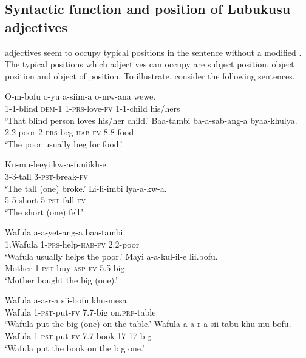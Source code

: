 \documentclass[output=paper,
modfonts
]{langscibook}
\begin{document}
\subsection{Syntactic function and position of Lubukusu adjectives  }

 adjectives seem to occupy typical  positions in the sentence without a modified . The typical  positions which  adjectives can occupy are subject position, object position and object of  position. To illustrate, consider the following sentences.

\ea\label{ex:wasike:17}
\ea
\gll O-m-bofu o-yu a-siim-a o-mw-ana wewe.\\
     1-1-blind \textsc{dem}-1 1-\textsc{prs}-love-\textsc{fv} 1-1-child his/hers\\
\glt ‘That blind person loves his/her child.’
\ex
\gll  Baa-tambi ba-a-sab-ang-a byaa-khulya.\\
     2.2-poor 2-\textsc{prs}-beg-\textsc{hab}-\textsc{fv} 8.8-food\\
\glt ‘The poor usually beg for food.’
\z
\z

\ea\label{ex:wasike:18}
\ea
\gll Ku-mu-leeyi kw-a-funiikh-e.\\
     3-3-tall 3-\textsc{pst}-break-\textsc{fv}\\
\glt ‘The tall (one) broke.’
\ex
\gll  Li-li-imbi lya-a-kw-a.\\
     5-5-short 5-\textsc{pst}-fall-\textsc{fv}\\
\glt ‘The short (one) fell.’
\z
\z

\ea\label{ex:wasike:19}
\ea
\gll Wafula a-a-yet-ang-a baa-tambi.\\
     1.Wafula 1-\textsc{prs}-help-\textsc{hab}-\textsc{fv} 2.2-poor\\
\glt ‘Wafula usually helps the poor.’
\ex
\gll  Mayi a-a-kul-il-e lii.bofu.\\
     Mother 1-\textsc{pst}-buy-\textsc{asp}-\textsc{fv} 5.5-big\\
\glt ‘Mother bought the big (one).’
\z
\z

\ea\label{ex:wasike:20}
\ea
\gll Wafula a-a-r-a sii-bofu khu-mesa.\\
     Wafula 1-\textsc{pst}-put-\textsc{fv} 7.7-big on.\textsc{prf}-table\\
\glt ‘Wafula put the big (one) on the table.’
\ex
\gll  Wafula a-a-r-a sii-tabu khu-mu-bofu.\\
     Wafula 1-\textsc{pst}-put-\textsc{fv} 7.7-book 17-17-big\\
\glt ‘Wafula put the book on the big one.’
\z
\z
\end{document}
